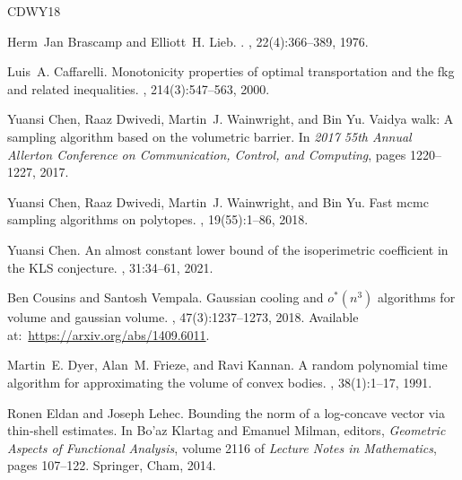 \documentclass[11pt]{article}
\numberwithin{equation}{section}
\theoremstyle{definition}
\begin{document}
\newcommand{\etalchar}[1]{$^{#1}$}
\begin{thebibliography}{CDWY18}

Herm~Jan Brascamp and Elliott~H. Lieb.
.
, 22(4):366--389, 1976.

Luis~A. Caffarelli.
\newblock Monotonicity properties of optimal transportation and the fkg and
  related inequalities.
, 214(3):547--563, 2000.

Yuansi Chen, Raaz Dwivedi, Martin~J. Wainwright, and Bin Yu.
\newblock Vaidya walk: A sampling algorithm based on the volumetric barrier.
\newblock In {\em 2017 55th Annual Allerton Conference on Communication,
  Control, and Computing}, pages 1220--1227, 2017.

Yuansi Chen, Raaz Dwivedi, Martin~J. Wainwright, and Bin Yu.
\newblock Fast mcmc sampling algorithms on polytopes.
, 19(55):1--86, 2018.

Yuansi Chen.
\newblock An almost constant lower bound of the isoperimetric coefficient in
  the {KLS} conjecture.
, 31:34--61, 2021.

Ben Cousins and Santosh Vempala.
\newblock Gaussian cooling and $o^*(n^3)$ algorithms for volume and gaussian
  volume.
, 47(3):1237--1273, 2018.
\newblock Available at:~\url{https://arxiv.org/abs/1409.6011}.

Martin~E. Dyer, Alan~M. Frieze, and Ravi Kannan.
\newblock A random polynomial time algorithm for approximating the volume of
  convex bodies.
, 38(1):1--17, 1991.

Ronen Eldan and Joseph Lehec.
\newblock Bounding the norm of a log-concave vector via thin-shell estimates.
\newblock In Bo'az Klartag and Emanuel Milman, editors, {\em Geometric Aspects
  of Functional Analysis}, volume 2116 of {\em Lecture Notes in Mathematics},
  pages 107--122. Springer, Cham, 2014.


\end{thebibliography}
\end{document}

